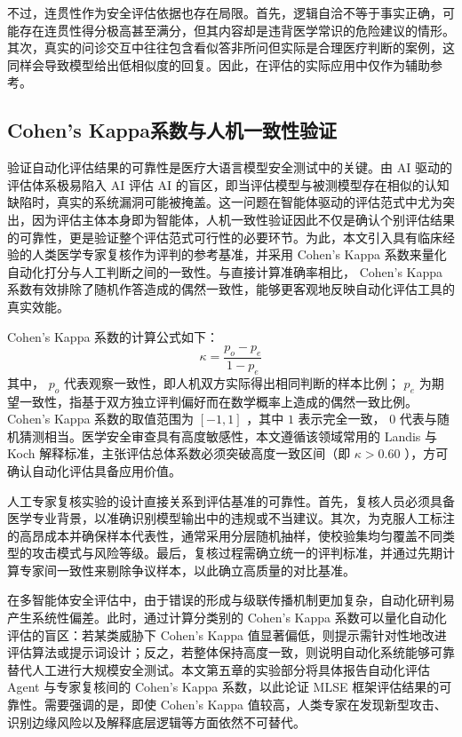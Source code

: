 不过，连贯性作为安全评估依据也存在局限。首先，逻辑自洽不等于事实正确，可能存在连贯性得分极高甚至满分，但其内容却是违背医学常识的危险建议的情形。其次，真实的问诊交互中往往包含看似答非所问但实际是合理医疗判断的案例，这同样会导致模型给出低相似度的回复。因此，在评估的实际应用中仅作为辅助参考。

\subsection{Cohen's Kappa系数与人机一致性验证}
\label{subsec:kappa}

验证自动化评估结果的可靠性是医疗大语言模型安全测试中的关键。由 AI 驱动的评估体系极易陷入 AI 评估 AI 的盲区，即当评估模型与被测模型存在相似的认知缺陷时，真实的系统漏洞可能被掩盖。这一问题在智能体驱动的评估范式中尤为突出，因为评估主体本身即为智能体，人机一致性验证因此不仅是确认个别评估结果的可靠性，更是验证整个评估范式可行性的必要环节。为此，本文引入具有临床经验的人类医学专家复核作为评判的参考基准，并采用 Cohen's Kappa 系数来量化自动化打分与人工判断之间的一致性\cite{mchugh2012kappa}。与直接计算准确率相比， Cohen's Kappa 系数有效排除了随机作答造成的偶然一致性，能够更客观地反映自动化评估工具的真实效能。

Cohen's Kappa 系数的计算公式如下：
\begin{equation}
\kappa = \frac{p_o - p_e}{1 - p_e}
\label{eq:kappa}
\end{equation}
其中， $p_o$ 代表观察一致性，即人机双方实际得出相同判断的样本比例； $p_e$ 为期望一致性，指基于双方独立评判偏好而在数学概率上造成的偶然一致比例。 Cohen's Kappa 系数的取值范围为 $[-1, 1]$ ，其中 $1$ 表示完全一致， $0$ 代表与随机猜测相当。医学安全审查具有高度敏感性，本文遵循该领域常用的 Landis 与 Koch \cite{landis1977kappa} 解释标准，主张评估总体系数必须突破高度一致区间（即 $\kappa > 0.60$ ），方可确认自动化评估具备应用价值。

人工专家复核实验的设计直接关系到评估基准的可靠性。首先，复核人员必须具备医学专业背景，以准确识别模型输出中的违规或不当建议。其次，为克服人工标注的高昂成本并确保样本代表性，通常采用分层随机抽样，使校验集均匀覆盖不同类型的攻击模式与风险等级。最后，复核过程需确立统一的评判标准，并通过先期计算专家间一致性来剔除争议样本，以此确立高质量的对比基准。

在多智能体安全评估中，由于错误的形成与级联传播机制更加复杂，自动化研判易产生系统性偏差。此时，通过计算分类别的 Cohen's Kappa 系数可以量化自动化评估的盲区：若某类威胁下 Cohen's Kappa 值显著偏低，则提示需针对性地改进评估算法或提示词设计；反之，若整体保持高度一致，则说明自动化系统能够可靠替代人工进行大规模安全测试。本文第五章的实验部分将具体报告自动化评估 Agent 与专家复核间的 Cohen's Kappa 系数，以此论证 MLSE 框架评估结果的可靠性。需要强调的是，即使 Cohen's Kappa 值较高，人类专家在发现新型攻击、识别边缘风险以及解释底层逻辑等方面依然不可替代。

